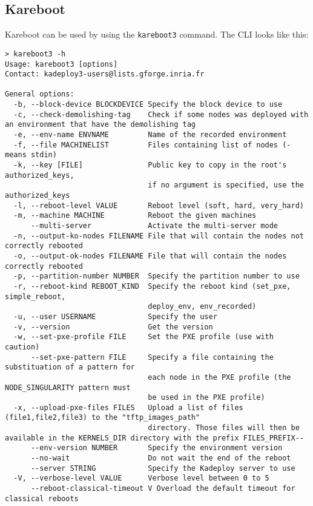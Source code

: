 \documentclass[a4wide,10pt,oneside]{book}
\begin{document}
\subsection{Kareboot}
Kareboot can be used by using the \texttt{kareboot3} command. The CLI looks like this:
\begin{small}
\begin{verbatim}
> kareboot3 -h
Usage: kareboot3 [options]
Contact: kadeploy3-users@lists.gforge.inria.fr

General options:
  -b, --block-device BLOCKDEVICE Specify the block device to use
  -c, --check-demolishing-tag    Check if some nodes was deployed with an environment that have the demolishing tag
  -e, --env-name ENVNAME         Name of the recorded environment
  -f, --file MACHINELIST         Files containing list of nodes (- means stdin)
  -k, --key [FILE]               Public key to copy in the root's authorized_keys, 
                                 if no argument is specified, use the authorized_keys
  -l, --reboot-level VALUE       Reboot level (soft, hard, very_hard)
  -m, --machine MACHINE          Reboot the given machines
      --multi-server             Activate the multi-server mode
  -n, --output-ko-nodes FILENAME File that will contain the nodes not correctly rebooted
  -o, --output-ok-nodes FILENAME File that will contain the nodes correctly rebooted
  -p, --partition-number NUMBER  Specify the partition number to use
  -r, --reboot-kind REBOOT_KIND  Specify the reboot kind (set_pxe, simple_reboot, 
                                 deploy_env, env_recorded)
  -u, --user USERNAME            Specify the user
  -v, --version                  Get the version
  -w, --set-pxe-profile FILE     Set the PXE profile (use with caution)
      --set-pxe-pattern FILE     Specify a file containing the substituation of a pattern for 
                                 each node in the PXE profile (the NODE_SINGULARITY pattern must
                                 be used in the PXE profile)
  -x, --upload-pxe-files FILES   Upload a list of files (file1,file2,file3) to the "tftp_images_path"
                                 directory. Those files will then be available in the KERNELS_DIR directory with the prefix FILES_PREFIX--
      --env-version NUMBER       Specify the environment version
      --no-wait                  Do not wait the end of the reboot
      --server STRING            Specify the Kadeploy server to use
  -V, --verbose-level VALUE      Verbose level between 0 to 5
      --reboot-classical-timeout V Overload the default timeout for classical reboots
\end{verbatim}
\end{small}
\end{document}
